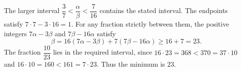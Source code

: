 The larger interval $\dfrac{3}{7}<\dfrac{\alpha}{\beta}<\dfrac{7}{16}$ contains the stated interval. The endpoints satisfy $7\cdot7-3\cdot16=1$. For any fraction strictly between them, the positive integers $7\alpha-3\beta$ and $7\beta-16\alpha$ satisfy
\[
\beta=16(7\alpha-3\beta)+7(7\beta-16\alpha)\ge16+7=23.
\]
The fraction $\dfrac{10}{23}$ lies in the required interval, since $16\cdot23=368<370=37\cdot10$ and $16\cdot10=160<161=7\cdot23$. Thus the minimum is $\boxed{23}$.

